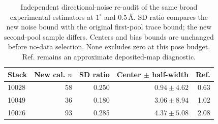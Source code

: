 \begin{table}[t]
\centering\small
\begin{tabular}{lrrrr}
\toprule
Stack & New cal. $n$ & SD ratio & Center $\pm$ half-width & Ref.\\
\midrule
10028 & 58 & 0.250 & $0.94\pm4.62$ & 0.63\\
10049 & 36 & 0.180 & $3.06\pm8.94$ & 1.02\\
10076 & 93 & 0.285 & $4.37\pm5.08$ & 2.08\\
\bottomrule
\end{tabular}
\caption{Independent directional-noise re-audit of the same broad experimental estimators at $1^\circ$ and 0.5\,\AA. SD ratio compares the new noise bound with the original first-pool trace bound; the new second-pool sample differs. Centers and bias bounds are unchanged before no-data selection. None excludes zero at this pose budget. Ref. remains an approximate deposited-map diagnostic.}
\label{tab:directionalnoise}
\end{table}
